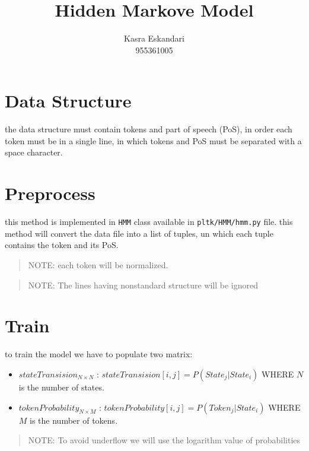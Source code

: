 \documentclass[]{article}
\author{Kasra Eskandari\\955361005}
\title{Hidden Markove Model}
\begin{document}
  \maketitle

  \section{Data Structure}\label{data-structure}

  the data structure must contain tokens and part of speech (PoS), in
  order each token must be in a single line, in which tokens and PoS must
  be separated with a space character.

  \section{Preprocess}\label{preprocess}

  this method is implemented in \texttt{HMM} class available in
  \texttt{pltk/HMM/hmm.py} file. this method will convert the data file
  into a list of tuples, un which each tuple contains the token and its
  PoS.

  \begin{quote}
    NOTE: each token will be normalized.
  \end{quote}

  \begin{quote}
    NOTE: The lines having nonstandard structure will be ignored
  \end{quote}

  \section{Train}\label{train}

  to train the model we have to populate two matrix:

  \begin{itemize}
    \item
      \(stateTransision_{N\times N}\) :
      \(stateTransision[i,j]=P(State_j|State_i)\) WHERE \(N\) is the number
      of states.
    \item
      \(tokenProbability_{N\times M}\) :
      \(tokenProbability[i,j]=P(Token_j|State_i)\) WHERE \(M\) is the number
      of tokens.
  \end{itemize}

  \begin{quote}
    NOTE: To avoid underflow we will use the logarithm value of
    probabilities
  \end{quote}
\end{document}
